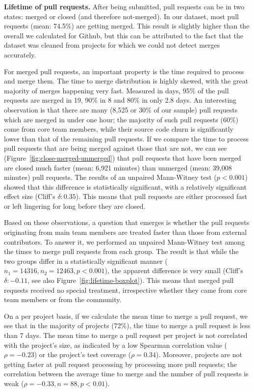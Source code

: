 \documentclass{sig-alternate}
\begin{document}
\textbf{Lifetime of pull requests.}
After being submitted, pull requests can be in two states: merged or closed
(and therefore not-merged).
In our dataset, most pull requests (mean: 74.5\%) are getting
merged. This result is slightly higher than the overall we calculated for
Github, but this can be attributed to the fact that the dataset was cleaned
from projects for which we could not detect merges accurately. 

For merged pull requests, an important property is the time required to process
and merge them. The time to merge distribution is highly skewed, with the great
majority of merges happening very fast. Measured in days, 95\% of the pull
requests are merged in 19, 90\% in 8 and 80\% in only 2.8 days. An interesting
observation is that there are many (8,525 or 30\% of our sample) pull requests
which are merged in under one hour; the majority of such pull requests (60\%)
come from core team members, while their source code churn is significantly
lower than that of the remaining pull requests. If we compare the time to
process pull requests that are being merged against those that are not, we can
see (Figure~\ref{fig:close-merged-unmerged}) that pull requests that have been
merged are closed much faster (mean: 6,921 minutes) than unmerged (mean: 39,008
minutes) pull requests.
The results of an unpaired Mann-Witney test ($p < 0.001$) showed that this difference is statistically significant, with a relatively
significant effect size (Cliff's $\delta: 0.35$). This means that pull requests
are either processed fast or left lingering for long before they are closed.

Based on these observations, a question that emerges is
whether the pull requests originating from main team members are treated faster
than those from external contributors. To answer it, we performed an unpaired
Mann-Witney test among the times to merge pull requests from each group. The
result is that while the two groups differ in a statistically significant manner
($n_1 = 14316, n_2 = 12463, p < 0.001$), the apparent difference is very small
(Cliff's $\delta: -0.11$, see also Figure~\ref{fig:lifetime-boxplot}). This
means that merged pull requests received no special treatment, irrespective
whether they came from core team members or from the community.

On a per project basis, if we calculate the mean time to merge a pull request,
we see that in the majority of projects (72\%), the time to merge a pull request
is less than 7 days. The mean time to merge a pull request per project is not
correlated with the project's size, as indicated by a low Spearman
correlation value ($\rho = -0.23$) or the project's test coverage ($\rho =
0.34$). 
Moreover, projects are not getting faster at pull request processing by
processing more pull requests; the correlation between the average time to merge
and the number of pull requests is weak ($\rho = -0.33, n = 88, p < 0.01$).
\end{document}
